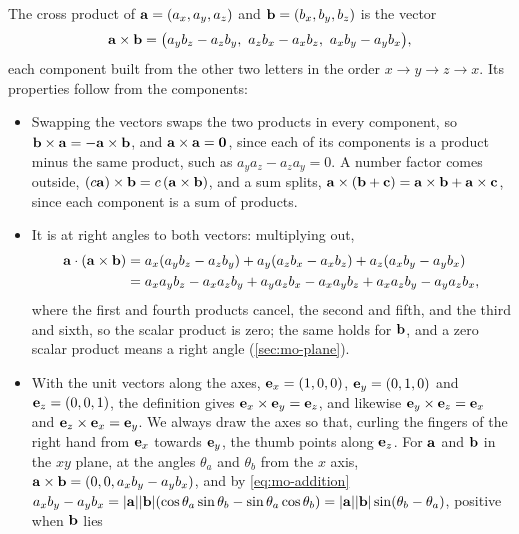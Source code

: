 \begin{toolbox}
The cross product of $\bm{\mathrm{a}} = (a_x, a_y, a_z)$ and $\bm{\mathrm{b}} = (b_x, b_y,
b_z)$ is the vector
\begin{equation*}
   \vb{a}\times\vb{b} = \bigl(a_yb_z - a_zb_y,\ a_zb_x - a_xb_z,\
   a_xb_y - a_yb_x\bigr) ,
\end{equation*}
each component built from the other two letters in the order $x \to y \to
z \to x$. Its properties follow from the components:
\begin{itemize}
\item Swapping the vectors swaps the two products in every component, so
   $\bm{\mathrm{b}}\times\bm{\mathrm{a}} = -\bm{\mathrm{a}}\times\bm{\mathrm{b}}$, and $\bm{\mathrm{a}}\times\bm{\mathrm{a}} = \bm{\mathrm{0}}$,
   since each of its components is a product minus the same product, such
   as $a_ya_z - a_za_y = 0$. A number factor comes outside, $(c\bm{\mathrm{a}})\times
   \bm{\mathrm{b}} = c\,(\bm{\mathrm{a}}\times\bm{\mathrm{b}})$, and a sum splits, $\bm{\mathrm{a}}\times(\bm{\mathrm{b}}
   + \bm{\mathrm{c}}) = \bm{\mathrm{a}}\times\bm{\mathrm{b}} + \bm{\mathrm{a}}\times\bm{\mathrm{c}}$, since each component
   is a sum of products.
\item It is at right angles to both vectors: multiplying out,
   \begin{align*}
      \bm{\mathrm{a}}\cdot(\bm{\mathrm{a}}\times\bm{\mathrm{b}})
      &= a_x(a_yb_z - a_zb_y) + a_y(a_zb_x - a_xb_z) + a_z(a_xb_y - a_yb_x)\\
      &= a_xa_yb_z - a_xa_zb_y + a_ya_zb_x - a_xa_yb_z + a_xa_zb_y - a_ya_zb_x ,
   \end{align*}
   where the first and fourth products cancel, the second and fifth, and
   the third and sixth, so the scalar product is zero; the same holds for
   $\bm{\mathrm{b}}$, and a zero scalar product means a right angle
   (\cref{sec:mo-plane}).
\item With the unit vectors along the axes, $\bm{\mathrm{e}}_x = (1, 0, 0)$,
   $\bm{\mathrm{e}}_y = (0, 1, 0)$ and $\bm{\mathrm{e}}_z = (0, 0, 1)$, the definition gives
   $\bm{\mathrm{e}}_x\times\bm{\mathrm{e}}_y = \bm{\mathrm{e}}_z$, and likewise $\bm{\mathrm{e}}_y\times\bm{\mathrm{e}}_z
   = \bm{\mathrm{e}}_x$ and $\bm{\mathrm{e}}_z\times\bm{\mathrm{e}}_x = \bm{\mathrm{e}}_y$. We always draw the
   axes so that, curling the fingers of the right hand from $\bm{\mathrm{e}}_x$
   towards $\bm{\mathrm{e}}_y$, the thumb points along $\bm{\mathrm{e}}_z$. For $\bm{\mathrm{a}}$ and
   $\bm{\mathrm{b}}$ in the $xy$ plane, at the angles $\theta_a$ and $\theta_b$ from the
   $x$ axis, $\bm{\mathrm{a}}\times\bm{\mathrm{b}} = (0, 0, a_xb_y - a_yb_x)$, and by
   \cref{eq:mo-addition} $a_xb_y - a_yb_x = \lvert\bm{\mathrm{a}}\rvert\lvert\bm{\mathrm{b}}
   \rvert(\cos\theta_a\sin\theta_b - \sin\theta_a\cos\theta_b) = \lvert\bm{\mathrm{a}}\rvert
   \lvert\bm{\mathrm{b}}\rvert\sin(\theta_b - \theta_a)$, positive when $\bm{\mathrm{b}}$ lies

\end{itemize}
\end{toolbox}
